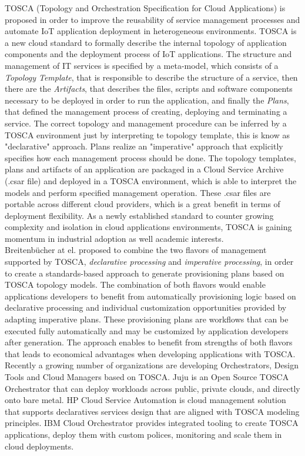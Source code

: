 \documentclass{../../llncs2e/llncs}
\begin{document}
  TOSCA (Topology and Orchestration Specification for Cloud Applications) \cite{li2013towards} is proposed in order to improve the reusability of service management
  processes and automate IoT application deployment in heterogeneous environments. TOSCA is a new cloud standard to formally describe the internal topology of
  application components and the deployment process of IoT applications. The structure and management of IT services is specified by a meta-model, which consists
  of a \textit{Topology Template}, that is responsible to describe the structure of a service, then there are the \textit{Artifacts}, that describes the files, scripts and
  software components necessary to be deployed in order to run the application, and finally the \textit{Plans}, that defined the management process of creating, deploying and
  terminating a service. The correct topology and management procedure can be inferred by a TOSCA environment just by interpreting te topology template, this is know
  as "declarative" approach. Plans realize an "imperative" approach that explicitly specifies how each management process should be done. The topology templates, plans
  and artifacts of an application are packaged in a Cloud Service Archive (.csar file) and deployed in a TOSCA environment, which is able to interpret the models and perform
  specified management operation. These .csar files are portable across different cloud providers, which is a great benefit in terms of deployment flexibility.
  As a newly established standard to counter growing complexity and isolation in cloud applications environments, TOSCA is gaining momentum in industrial adoption as well academic interests.\\

  Breitenb\"{u}cher at el. \cite{breitenbucher2014combining} proposed to combine the two flavors of management supported by TOSCA, \textit{declarative processing} and
  \textit{imperative processing}, in order to create a standards-based approach to generate provisioning plans based on TOSCA topology models. The
  combination of both flavors would enable applications developers to benefit from automatically provisioning logic based on declarative processing and
  individual customization opportunities provided by adapting imperative plans. These provisioning plans are workflows that can be executed fully automatically and
  may be customized by application developers after generation. The approach enables to benefit from strengths of both flavors that leads to economical advantages
  when developing applications with TOSCA.\\

  Recently a growing number of organizations are developing Orchestrators, Design Tools and Cloud Managers based on TOSCA. Juju is an Open Source TOSCA Orchestrator that
  can deploy workloads across public, private clouds, and directly onto bare metal. HP Cloud Service Automation is cloud management solution that supports declaratives
  services design that are aligned with TOSCA modeling principles. IBM Cloud Orchestrator provides integrated tooling to create TOSCA applications, deploy them with custom
  polices, monitoring and scale them in cloud deployments.



\end{document}
